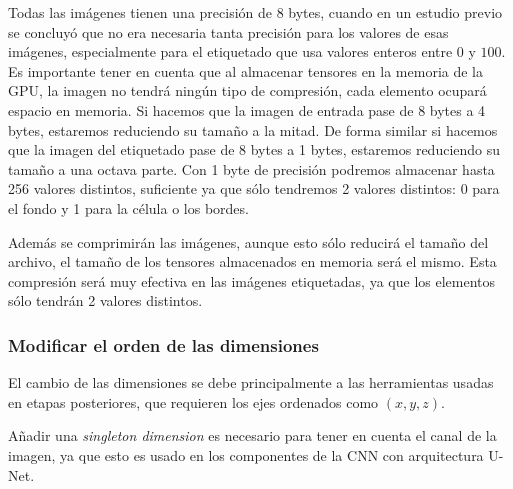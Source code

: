 Todas las imágenes tienen una precisión de 8 bytes, cuando en un estudio previo se concluyó que no era necesaria tanta precisión para los valores de esas imágenes, especialmente para el etiquetado que usa valores enteros entre $0$ y $100$. Es importante tener en cuenta que al almacenar tensores en la memoria de la GPU, la imagen no tendrá ningún tipo de compresión, cada elemento ocupará espacio en memoria. Si hacemos que la imagen de entrada pase de 8 bytes a 4 bytes, estaremos reduciendo su tamaño a la mitad. De forma similar si hacemos que la imagen del etiquetado pase de 8 bytes a 1 bytes, estaremos reduciendo su tamaño a una octava parte. Con 1 byte de precisión podremos almacenar hasta 256 valores distintos, suficiente ya que sólo tendremos 2 valores distintos: 0 para el fondo y 1 para la célula o los bordes.

Además se comprimirán las imágenes, aunque esto sólo reducirá el tamaño del archivo, el tamaño de los tensores almacenados en memoria será el mismo. Esta compresión será muy efectiva en las imágenes etiquetadas, ya que los elementos sólo tendrán 2 valores distintos.

\subsubsection{Modificar el orden de las dimensiones}

El cambio de las dimensiones se debe principalmente a las herramientas usadas en etapas posteriores, que requieren los ejes ordenados como $(x,y,z)$.

Añadir una \textit{singleton dimension} es necesario para tener en cuenta el canal de la imagen, ya que esto es usado en los componentes de la CNN con arquitectura U-Net.